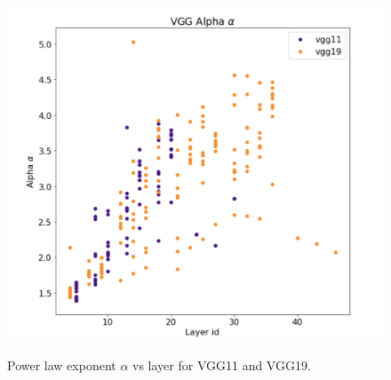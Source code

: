 \begin{figure}
  \centering
  \includegraphics[scale=0.30]{img/vgg-alpha-layers.png}
  \label{fig:vgg-alpha-layers}
    \caption{Power law exponent $\alpha$ vs layer for VGG11 and VGG19. }
\end{figure}
